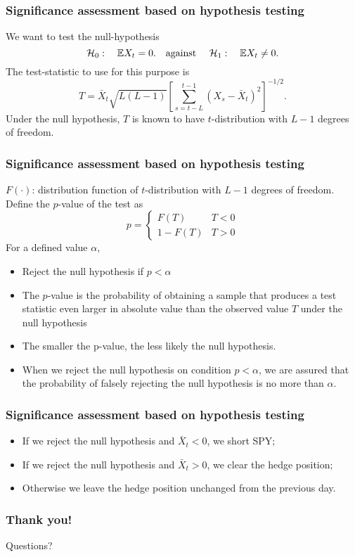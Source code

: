 \documentclass{beamer}
\begin{document}
\begin{frame}
  \frametitle{Significance assessment based on hypothesis testing}
  We want to test the null-hypothesis
  \[
    \mathcal H_0:\quad
    \mathbb{E} X_t = 0.
    \quad
    \text{against }
    \quad
    \mathcal H_1:\quad
    \mathbb{E} X_t \neq 0.
  \]
  The test-statistic to use for this purpose is
  \[
    T = \bar X_t \sqrt{L(L - 1)} \left[
      \sum_{s=t-L}^{t-1} (X_s - \bar X_t)^2
    \right]^{-1/2}.
  \]
  Under the null hypothesis, $T$ is known to have $t$-distribution
  with $L-1$ degrees of freedom.
\end{frame}

\begin{frame}
  \frametitle{Significance assessment based on hypothesis testing}
  $F(\cdot)$: distribution function of $t$-distribution with $L-1$
  degrees of freedom. Define the $p$-value of the test as
  \[
    p = \left\{
      \begin{array}{ll}
        F(T) & T < 0 \\
        1 - F(T) & T > 0
      \end{array}
    \right.
  \]
  For a defined value $\alpha$,
  \begin{itemize}
  \item Reject the null hypothesis if $p < \alpha$
  \item The $p$-value is the probability of obtaining a sample that
    produces a test statistic even larger in absolute value than the
    observed value $T$ under the null hypothesis
  \item The smaller the p-value, the less likely the null
    hypothesis.
  \item When we reject the null hypothesis on condition $p < \alpha$,
    we are assured that the probability of falsely rejecting the null
    hypothesis is no more than $\alpha$.
  \end{itemize}
\end{frame}

\begin{frame}
  \frametitle{Significance assessment based on hypothesis testing}
  \begin{itemize}
  \item If we reject the null hypothesis and $\bar X_t < 0$, we short
    SPY;
  \item If we reject the null hypothesis and $\bar X_t > 0$, we clear
    the hedge position;
  \item Otherwise we leave the hedge position unchanged from the
    previous day.
  \end{itemize}
\end{frame}



\begin{frame}
   \frametitle{Thank you!}
   Questions?
 \end{frame}


\end{document}
